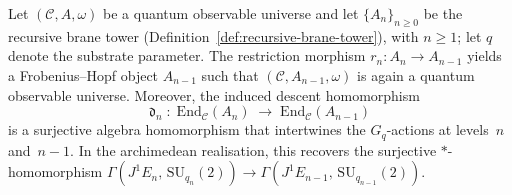 \begin{lemma}
\label{lem:descent}
Let $(\mathcal{C}, A, \omega)$ be a quantum observable universe and let
$\{A_n\}_{n \geq 0}$ be the recursive brane tower
(Definition~\ref{def:recursive-brane-tower}), with $n \geq 1$; let $q$ denote the substrate parameter.  The
restriction morphism $r_n \colon A_n \to A_{n-1}$ yields a Frobenius--Hopf
object $A_{n-1}$ such that $(\mathcal{C}, A_{n-1}, \omega)$ is again a
quantum observable universe.  Moreover, the induced descent homomorphism
\[
  \mathfrak{d}_n \;\colon\;
  \mathrm{End}_{\mathcal{C}}(A_n)
  \;\longrightarrow\;
  \mathrm{End}_{\mathcal{C}}(A_{n-1})
\]
is a surjective algebra homomorphism that intertwines the $G_q$-actions at
levels~$n$ and~$n{-}1$.  In the archimedean realisation, this recovers
the surjective $*$-homomorphism
$\Gamma(J^1 E_n,\, \mathrm{SU}_{q_n}(2)) \to
\Gamma(J^1 E_{n-1},\, \mathrm{SU}_{q_{n-1}}(2))$.
\end{lemma}

